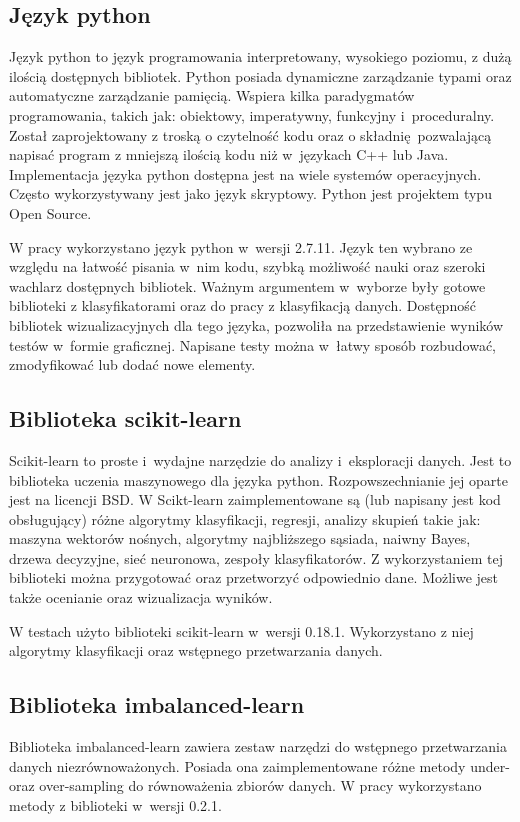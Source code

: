 \subsection{Język python}
Język python to język programowania interpretowany, wysokiego poziomu, z dużą ilością dostępnych bibliotek. Python\cite{python} posiada dynamiczne zarządzanie typami oraz automatyczne zarządzanie pamięcią. Wspiera kilka paradygmatów programowania, takich jak: obiektowy, imperatywny, funkcyjny i~proceduralny. Został zaprojektowany z troską o czytelność kodu oraz o składnię pozwalającą napisać program z mniejszą ilością kodu niż w~językach C++ lub Java. Implementacja języka python dostępna jest na wiele systemów operacyjnych. Często wykorzystywany jest jako język skryptowy. Python jest projektem typu Open Source. \par
W pracy wykorzystano język python w~wersji 2.7.11. Język ten wybrano ze względu na łatwość pisania w~nim kodu, szybką możliwość nauki oraz szeroki wachlarz dostępnych bibliotek. Ważnym argumentem w~wyborze były gotowe biblioteki z klasyfikatorami oraz do pracy z klasyfikacją danych. Dostępność bibliotek wizualizacyjnych dla tego języka, pozwoliła na przedstawienie wyników testów w~formie graficznej. Napisane testy można w~łatwy sposób rozbudować, zmodyfikować lub dodać nowe elementy.    

\subsection{Biblioteka scikit-learn}
Scikit-learn\cite{scikit} to proste i~wydajne narzędzie do analizy i~eksploracji danych. Jest to biblioteka uczenia maszynowego dla języka python. Rozpowszechnianie jej oparte jest na licencji BSD. W Scikt-learn zaimplementowane są (lub napisany jest kod obsługujący) różne algorytmy klasyfikacji, regresji, analizy skupień takie jak: maszyna wektorów nośnych, algorytmy najbliższego sąsiada, naiwny Bayes, drzewa decyzyjne, sieć neuronowa, zespoły klasyfikatorów. Z wykorzystaniem tej biblioteki można przygotować oraz przetworzyć odpowiednio dane. Możliwe jest także ocenianie oraz wizualizacja wyników. \par
W testach użyto biblioteki scikit-learn w~wersji 0.18.1. Wykorzystano z niej algorytmy klasyfikacji oraz wstępnego przetwarzania danych.
\subsection{Biblioteka imbalanced-learn}
Biblioteka imbalanced-learn\cite{imlearn} zawiera zestaw narzędzi do wstępnego przetwarzania danych niezrównoważonych. Posiada ona zaimplementowane różne metody under- oraz over-sampling do równoważenia zbiorów danych. W pracy wykorzystano metody z biblioteki w~wersji 0.2.1. 
